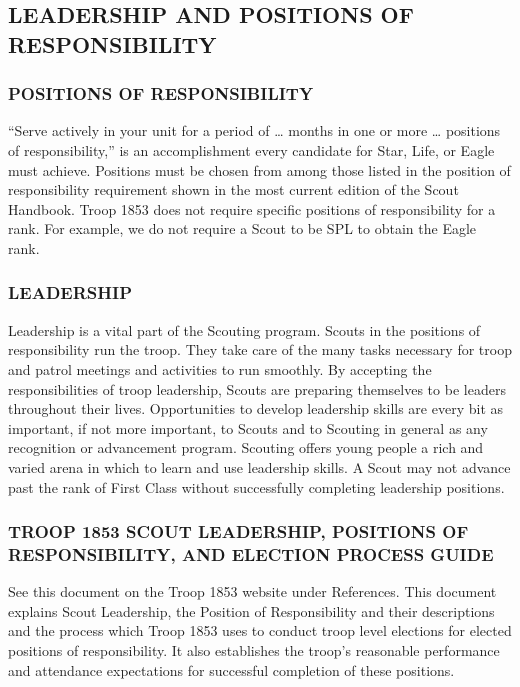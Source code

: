 \documentclass{ltxguide}
\begin{document}
\subsection{LEADERSHIP AND POSITIONS OF RESPONSIBILITY}
\subsubsection{POSITIONS OF RESPONSIBILITY}
“Serve actively in your unit for a period of … months in one or more … positions of responsibility,” is an accomplishment every candidate for Star, Life, or Eagle must achieve. Positions must be chosen from among those listed in the position of responsibility requirement shown in the most current edition of the Scout Handbook. Troop 1853 does not require specific positions of responsibility for a rank. For example, we do not require a Scout to be \ac{SPL} to obtain the Eagle rank.

\subsubsection{LEADERSHIP}
Leadership is a vital part of the Scouting program. Scouts in the positions of responsibility run the troop. They take care of the many tasks necessary for troop and patrol meetings and activities to run smoothly. By accepting the responsibilities of troop leadership, Scouts are preparing themselves to be leaders throughout their lives. Opportunities to develop leadership skills are every bit as important, if not more important, to Scouts and to Scouting in general as any recognition or advancement program. Scouting offers young people a rich and varied arena in which to learn and use leadership skills. A Scout may not advance past the rank of First Class without successfully completing leadership positions.

\subsubsection{TROOP 1853 SCOUT LEADERSHIP, POSITIONS OF RESPONSIBILITY, AND ELECTION PROCESS GUIDE}
See this document on the Troop 1853 website under References. This document explains Scout Leadership, the Position of Responsibility and their descriptions and the process which Troop 1853 uses to conduct troop level elections for elected positions of responsibility. It also establishes the troop's reasonable performance and attendance expectations for successful completion of these positions.
\end{document}

